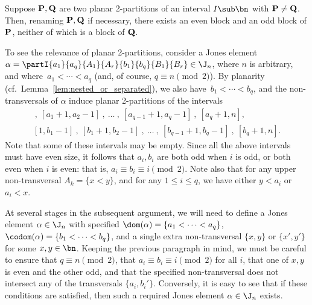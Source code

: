 \newcommand{\bP}{{\bf P}}
\newcommand{\bQ}{{\bf Q}}

\begin{lemma}\label{lem:odd}
Suppose $\bP,\bQ$ are two planar 2-partitions of an interval $I\sub\bn$ with $\bP\not=\bQ$.  Then, renaming $\bP,\bQ$ if necessary, there exists an even block and an odd block of $\bP$, neither of which is a block of $\bQ$. \epfres
\end{lemma}





To see the relevance of planar 2-partitions, consider a Jones element ${\alpha=\partI{a_1}{a_q}{A_1}{A_r}{b_1}{b_q}{B_1}{B_r}\in\J_n}$, where $n$ is arbitrary, and where~$a_1<\cdots<a_q$
(and, of course,  $q\equiv n\pmod2$).  By planarity (cf.~Lemma~\ref{lem:nested_or_separated}), we also have~${b_1<\cdots<b_q}$, and the non-transversals of $\alpha$ induce planar 2-partitions of the intervals
\begin{gather*}
[1,a_1-1]\ , \ [a_1+1,a_2-1] \ ,\ \ldots\ ,\ [a_{q-1}+1,a_q-1]\ ,\  [a_q+1,n] , \\
[1,b_1-1]\  , \ [b_1+1,b_2-1] \ ,\ \ldots\ ,\ [b_{q-1}+1,b_q-1]\ ,\  [b_q+1,n].
\end{gather*}
%
Note that some of these intervals may be empty.  Since all the above intervals must have even size, it follows that $a_i,b_i$ are both odd when $i$ is odd, or both even when $i$ is even: that is, $a_i\equiv b_i\equiv i\pmod2$.  Note also that for any upper non-transversal $A_k=\{x<y\}$, and for any $1\leq i\leq q$, we have either $y<a_i$ or $a_i<x$.

\begin{rem}\label{rem:Jdefine}
At several stages in the subsequent argument, we will need to define a Jones element $\alpha\in\J_n$ with specified $\dom(\alpha)=\{a_1<\cdots<a_q\}$, $\codom(\alpha)=\{b_1<\cdots<b_q\}$, and a single extra non-transversal $\{x,y\}$ or $\{x',y'\}$ for some $x,y\in\bn$.
Keeping the previous paragraph in mind, we must be careful to ensure that ${q\equiv n\pmod2}$, that $a_i\equiv b_i\equiv i\pmod2$ for all $i$, that one of $x,y$ is even and the other odd, and that the specified non-transversal does not intersect any of the transversals $\{a_i,b_i'\}$.  Conversely, it is easy to see that if these conditions are satisfied, then such a required Jones element $\alpha\in\J_n$ exists.
\end{rem}





